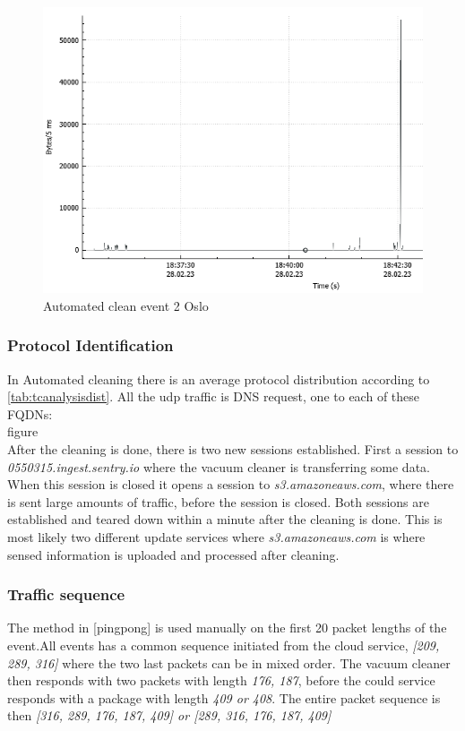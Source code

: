 \begin{figure}[H]
    \centering
    \includegraphics[width=\textwidth]{figures/TC-graph.png}
    \caption{Automated clean event 2 Oslo}
    \label{fig:Tc-graph}
\end{figure}

\subsubsection{Protocol Identification}
In Automated cleaning there is an average protocol distribution according to \ref{tab:tcanalysisdist}. All the udp traffic is DNS request, one to each of these FQDNs:
\\
figure
\\



After the cleaning is done, there is two new sessions established. First a session to \textit{0550315.ingest.sentry.io} where the vacuum cleaner is transferring some data. When this session is closed it opens a session to \textit{s3.amazoneaws.com}, where there is sent large amounts of traffic, before the session is closed. Both sessions are established and teared down within a minute after the cleaning is done. This is most likely two different update services where \textit{s3.amazoneaws.com} is where sensed information is uploaded and processed after cleaning.

\subsubsection{Traffic sequence}
The method in [pingpong] is used manually on the first 20 packet lengths of the
event.All events has a common sequence initiated from the cloud service, \textit{[209, 289, 316]} where the two last packets can be in mixed order. The vacuum cleaner then responds with two packets with length \textit{176, 187}, before the could service responds with a package with length \textit{409 or 408}. The entire packet sequence is then \textit{[316, 289, 176, 187, 409] or [289, 316, 176, 187, 409]
}


